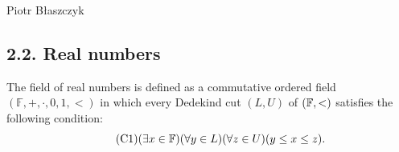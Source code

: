 \begin{artengenv}{Piotr Błaszczyk}
 
     
     

%
%
%
%
%

\subsection{2.2. Real numbers}

 The field of real numbers   is  defined as a commutative ordered field $(\mathbb F,+,\cdotp,0,1,<)$ in which
 every Dedekind cut $(L,U)$ of $({\mathbb{F}},<)$ satisfies the following condition:
\begin{equation}\tag{C1}(\exists x\in{\mathbb{F}})(\forall y\in L)(\forall z\in U)(y\leq x\leq z).
\end{equation}



\end{artengenv}
